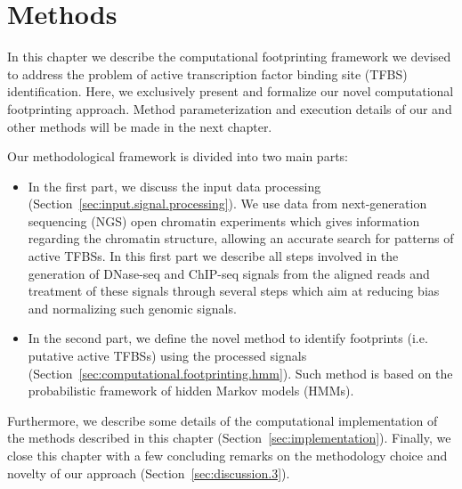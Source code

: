 \chapter{Methods}
\label{cha:methods}

\graphicspath{{chapter3/figs/}}

In this chapter we describe the computational footprinting framework we devised to address the problem of active transcription factor binding site (TFBS) identification. Here, we exclusively present and formalize our novel computational footprinting approach. Method parameterization and execution details of our and other methods will be made in the next chapter.

Our methodological framework is divided into two main parts:
\begin{itemize}
\item In the first part, we discuss the input data processing (Section~\ref{sec:input.signal.processing}). We use data from next-generation sequencing (NGS) open chromatin experiments which gives information regarding the chromatin structure, allowing an accurate search for patterns of active TFBSs. In this first part we describe all steps involved in the generation of DNase-seq and ChIP-seq signals from the aligned reads and treatment of these signals through several steps which aim at reducing bias and normalizing such genomic signals.
\item In the second part, we define the novel method to identify footprints (i.e. putative active TFBSs) using the processed signals (Section~\ref{sec:computational.footprinting.hmm}). Such method is based on the probabilistic framework of hidden Markov models (HMMs).
\end{itemize}

Furthermore, we describe some details of the computational implementation of the methods described in this chapter (Section~\ref{sec:implementation}). Finally, we close this chapter with a few concluding remarks on the methodology choice and novelty of our approach (Section~\ref{sec:discussion.3}).

